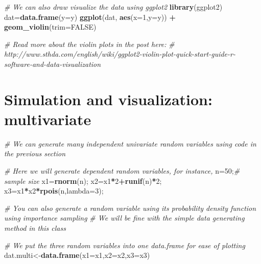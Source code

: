 \documentclass[12pt,]{book}
\newenvironment{Shaded}{\begin{snugshade}}{\end{snugshade}}
\newcommand{\KeywordTok}[1]{\textcolor[rgb]{0.13,0.29,0.53}{\textbf{#1}}}
\newcommand{\DataTypeTok}[1]{\textcolor[rgb]{0.13,0.29,0.53}{#1}}
\newcommand{\DecValTok}[1]{\textcolor[rgb]{0.00,0.00,0.81}{#1}}
\newcommand{\StringTok}[1]{\textcolor[rgb]{0.31,0.60,0.02}{#1}}
\newcommand{\CommentTok}[1]{\textcolor[rgb]{0.56,0.35,0.01}{\textit{#1}}}
\newcommand{\OtherTok}[1]{\textcolor[rgb]{0.56,0.35,0.01}{#1}}
\newcommand{\OperatorTok}[1]{\textcolor[rgb]{0.81,0.36,0.00}{\textbf{#1}}}
\newcommand{\NormalTok}[1]{#1}
\begin{document}
\begin{Shaded}
\begin{Highlighting}[]
\CommentTok{# We can also draw visualize the data using ggplot2}
\KeywordTok{library}\NormalTok{(ggplot2)}
\NormalTok{dat=}\KeywordTok{data.frame}\NormalTok{(}\DataTypeTok{y=}\NormalTok{y)}
\KeywordTok{ggplot}\NormalTok{(dat, }\KeywordTok{aes}\NormalTok{(}\DataTypeTok{x=}\DecValTok{1}\NormalTok{,}\DataTypeTok{y=}\NormalTok{y)) }\OperatorTok{+}\StringTok{ }
\StringTok{  }\KeywordTok{geom_violin}\NormalTok{(}\DataTypeTok{trim=}\OtherTok{FALSE}\NormalTok{)}
\end{Highlighting}
\end{Shaded}

\begin{Shaded}
\begin{Highlighting}[]
\CommentTok{# Read more about the violin plots in the post here:}
\CommentTok{# http://www.sthda.com/english/wiki/ggplot2-violin-plot-quick-start-guide-r-software-and-data-visualization}
\end{Highlighting}
\end{Shaded}

\section{Simulation and visualization:
multivariate}\label{simulation-and-visualization-multivariate}

\begin{Shaded}
\begin{Highlighting}[]
\CommentTok{# We can generate many independent univariate random variables using code in the previous section }

\CommentTok{# Here we will generate dependent random variables, for instance, }
\NormalTok{n=}\DecValTok{50}\NormalTok{;}\CommentTok{# sample size}
\NormalTok{x1=}\KeywordTok{rnorm}\NormalTok{(n);}
\NormalTok{x2=x1}\OperatorTok{*}\DecValTok{2}\OperatorTok{+}\KeywordTok{runif}\NormalTok{(n)}\OperatorTok{*}\DecValTok{2}\NormalTok{;}
\NormalTok{x3=x1}\OperatorTok{*}\NormalTok{x2}\OperatorTok{*}\KeywordTok{rpois}\NormalTok{(n,}\DataTypeTok{lambda=}\DecValTok{3}\NormalTok{);}

\CommentTok{# You can also generate a random variable using its probability density function using importance sampling}
\CommentTok{# We will be fine with the simple data generating method in this class }

\CommentTok{# We put the three random variables into one data.frame for ease of plotting }
\NormalTok{dat.multi<-}\KeywordTok{data.frame}\NormalTok{(}\DataTypeTok{x1=}\NormalTok{x1,}\DataTypeTok{x2=}\NormalTok{x2,}\DataTypeTok{x3=}\NormalTok{x3)}
\end{Highlighting}
\end{Shaded}
\end{document}
